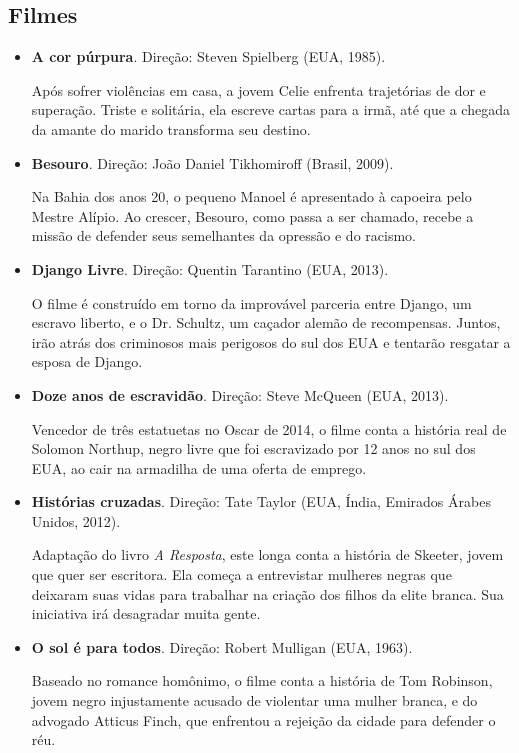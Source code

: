 \documentclass[11pt]{extarticle}
\begin{document}
\subsection{Filmes}

\begin{itemize}
\item
\textbf{A cor púrpura}. Direção: Steven Spielberg (EUA, 1985).

Após sofrer violências em casa, a jovem Celie enfrenta trajetórias de
dor e superação. Triste e solitária, ela escreve cartas para a irmã, até
que a chegada da amante do marido transforma seu destino.

\item
\textbf{Besouro}. Direção: João Daniel Tikhomiroff (Brasil, 2009).

Na Bahia dos anos 20, o pequeno Manoel é apresentado à capoeira pelo
Mestre Alípio. Ao crescer, Besouro, como passa a ser chamado, recebe a
missão de defender seus semelhantes da opressão e do racismo.

\item
\textbf{Django Livre}. Direção: Quentin Tarantino (EUA, 2013).

O filme é construído em torno da improvável parceria entre Django, um
escravo liberto, e o Dr. Schultz, um caçador alemão de recompensas.
Juntos, irão atrás dos criminosos mais perigosos do sul dos EUA e
tentarão resgatar a esposa de Django.

\item
\textbf{Doze anos de escravidão}. Direção: Steve McQueen (EUA, 2013).

Vencedor de três estatuetas no Oscar de 2014, o filme conta a história
real de Solomon Northup, negro livre que foi escravizado por 12 anos no
sul dos EUA, ao cair na armadilha de uma oferta de emprego.

\item
\textbf{Histórias cruzadas}. Direção: Tate Taylor (EUA, Índia,
Emirados Árabes Unidos, 2012).

Adaptação do livro \emph{A Resposta}, este longa conta a história de
Skeeter, jovem que quer ser escritora. Ela começa a entrevistar mulheres
negras que deixaram suas vidas para trabalhar na criação dos filhos da
elite branca. Sua iniciativa irá desagradar muita gente.

\item
\textbf{O sol é para todos}. Direção: Robert Mulligan (EUA, 1963).

Baseado no romance homônimo, o filme conta a história de Tom Robinson,
jovem negro injustamente acusado de violentar uma mulher branca, e do
advogado Atticus Finch, que enfrentou a rejeição da cidade para defender
o réu.
\end{itemize}
\end{document}
